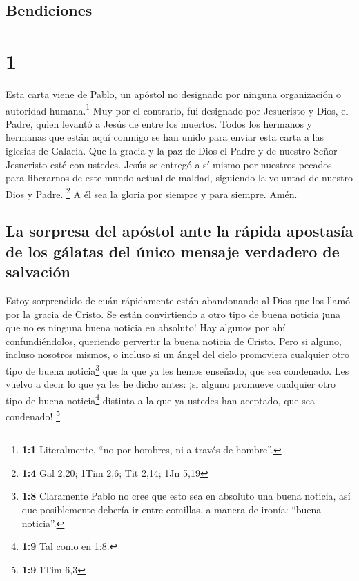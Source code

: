 \hypertarget{bendiciones}{%
\subsection{Bendiciones}\label{bendiciones}}

\hypertarget{section}{%
\section{1}\label{section}}

 Esta carta viene de Pablo, un apóstol no designado por
ninguna organización o autoridad humana.\footnote{\textbf{1:1}
  Literalmente, ``no por hombres, ni a través de hombre''.} Muy por el
contrario, fui designado por Jesucristo y Dios, el Padre, quien levantó
a Jesús de entre los muertos.  Todos los hermanos y
hermanas que están aquí conmigo se han unido para enviar esta carta a
las iglesias de Galacia.  Que la gracia y la paz de Dios
el Padre y de nuestro Señor Jesucristo esté con ustedes. 
Jesús se entregó a sí mismo por nuestros pecados para liberarnos de este
mundo actual de maldad, siguiendo la voluntad de nuestro Dios y Padre.
\footnote{\textbf{1:4} Gal 2,20; 1Tim 2,6; Tit 2,14; 1Jn 5,19}
 A él sea la gloria por siempre y para siempre. Amén.

\hypertarget{la-sorpresa-del-apuxf3stol-ante-la-ruxe1pida-apostasuxeda-de-los-guxe1latas-del-uxfanico-mensaje-verdadero-de-salvaciuxf3n}{%
\subsection{La sorpresa del apóstol ante la rápida apostasía de los
gálatas del único mensaje verdadero de
salvación}\label{la-sorpresa-del-apuxf3stol-ante-la-ruxe1pida-apostasuxeda-de-los-guxe1latas-del-uxfanico-mensaje-verdadero-de-salvaciuxf3n}}

 Estoy sorprendido de cuán rápidamente están abandonando
al Dios que los llamó por la gracia de Cristo. Se están convirtiendo a
otro tipo de buena noticia  ¡una que no es ninguna buena
noticia en absoluto! Hay algunos por ahí confundiéndolos, queriendo
pervertir la buena noticia de Cristo.  Pero si alguno,
incluso nosotros mismos, o incluso si un ángel del cielo promoviera
cualquier otro tipo de buena noticia\footnote{\textbf{1:8} Claramente
  Pablo no cree que esto sea en absoluto una buena noticia, así que
  posiblemente debería ir entre comillas, a manera de ironía: ``buena
  noticia''.} que la que ya les hemos enseñado, que sea condenado.
 Les vuelvo a decir lo que ya les he dicho antes: ¡si
alguno promueve cualquier otro tipo de buena noticia\footnote{\textbf{1:9}
  Tal como en 1:8.} distinta a la que ya ustedes han aceptado, que sea
condenado! \footnote{\textbf{1:9} 1Tim 6,3}

